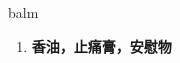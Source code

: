 
\begin{frame}
{\huge balm}
\begin{center}
\begin{enumerate}\Large
  \item \textbf{香油，止痛膏，安慰物}
\end{enumerate}
\end{center}
\end{frame}

